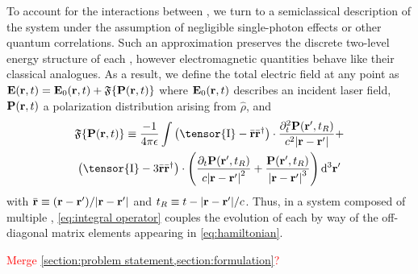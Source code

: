 To account for the interactions between \qds{}, we turn to a semiclassical description of the system under the assumption of negligible single-photon effects or other quantum correlations.
Such an approximation preserves the discrete two-level energy structure of each \qd{}, however electromagnetic quantities behave like their classical analogues.
As a result, we define the total electric field at any point as $\vb{E}(\vb{r}, t) = \vb{E}_0(\vb{r}, t) + \mathfrak{F}\{ \vb{P}(\vb{r}, t) \}$
where $\vb{E}_0(\vb{r}, t)$ describes an incident laser field, $\vb{P}(\vb{r}, t)$ a polarization distribution arising from $\hat{\rho}$, and
\begin{equation}
  \begin{gathered}
    \mathfrak{F}\{\vb{P}(\vb{r}, t)\} \equiv
      \frac{-1}{4\pi \epsilon} \int
      \left(\tensor{\mathrm{I}} -  \bar{\mathbf{r}}\bar{\mathbf{r}}^\dagger\right) \cdot \frac{\partial_t^2 \mathbf{P}(\mathbf{r}', t_R)}{c^2 \abs{\mathbf{r}-\mathbf{r}'}} + \\
      \left(\tensor{\mathrm{I}} - 3\bar{\mathbf{r}}\bar{\mathbf{r}}^\dagger\right) \cdot \qty(
        \frac{\partial_t   \mathbf{P}(\mathbf{r}', t_R)}{c \abs{\mathbf{r}-\mathbf{r}'}^2} +
        \frac{             \mathbf{P}(\mathbf{r}', t_R)}{  \abs{\mathbf{r}-\mathbf{r}'}^3}
      )
    \, \mathrm{d}^3 \mathbf{r'}
  \end{gathered}
  \label{eq:integral operator}
\end{equation}
with $\bar{\vb{r}} \equiv \qty(\vb{r} - \vb{r}')/\abs{\vb{r} - \vb{r}'}$ and $t_R \equiv t - \abs{\vb{r} - \vb{r}'}/c$.
Thus, in a system composed of multiple \qds{}, \cref{eq:integral operator} couples the evolution of each \qd{} by way of the off-diagonal matrix elements appearing in \cref{eq:hamiltonian}.

\textcolor{red}{Merge \cref{section:problem statement,section:formulation}?}
